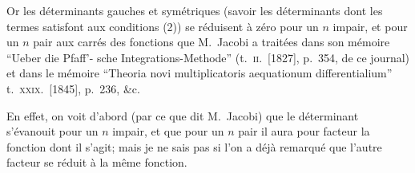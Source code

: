 \documentclass[11pt]{article}
\begin{document}
\vfill\pagebreak

Or les d\'eterminants gauches et sym\'etriques (savoir les d\'eterminants dont les termes
satisfont aux conditions (2)) se r\'eduisent \`a z\'ero pour un $n$ impair, et pour un $n$ pair
aux carr\'es des fonctions que M.\ Jacobi a trait\'ees dans son m\'emoire ``Ueber die Pfaff'-
sche Integrations-Methode'' (t.\ \textsc{ii}.\ [1827], p.\ 354, de ce journal) et dans le m\'emoire
``Theoria novi multiplicatoris aequationum differentialium'' t.\ \textsc{xxix}.\ [1845], p.\ 236, \&c.

\medskip

En effet, on voit d'abord (par ce que dit M.\ Jacobi) que le d\'eterminant s'\'evanouit
pour un $n$ impair, et que pour un $n$ pair il aura pour facteur la fonction dont il
s'agit; mais je ne sais pas si l'on a d\'ej\`a remarqu\'e que l'autre facteur se r\'eduit \`a la
m\^eme fonction.

\medskip
\end{document}
